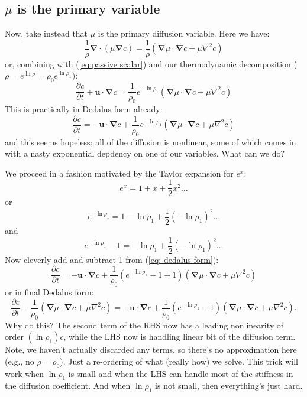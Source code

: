 \documentclass[letterpaper,12pt]{paper}
\newcommand{\del}{\ensuremath{\mathbf{\nabla}}}
\renewcommand{\vec}[1]{\ensuremath{\mathbf{#1}}}
\begin{document}
\newpage
\subsection{$\mu$ is the primary variable}
Now, take instead that $\mu$ is the primary diffusion variable.  Here we have:
\begin{equation}
\frac{1}{\rho} \del \cdot \left(\mu \del c\right) = \frac{1}{\rho}\left(\del \mu \cdot \del c + \mu \nabla^2 c\right) 
\end{equation}
or, combining with (\ref{eq:passive scalar}) and our thermodynamic decomposition ($\rho = e^{\ln \rho} = \rho_0 e^{\ln \rho_1})$:
\begin{equation}
\frac{\partial c}{\partial t} + \vec{u}\cdot\del c  = \frac{1}{\rho_0}e^{-\ln \rho_1}\left(\del \mu \cdot \del c + \mu \nabla^2 c\right) 
\end{equation}
This is practically in Dedalus form already:
\begin{equation}
\frac{\partial c}{\partial t} = -\vec{u}\cdot\del c  + \frac{1}{\rho_0}e^{-\ln \rho_1}\left(\del \mu \cdot \del c + \mu \nabla^2 c\right) 
\label{eq: dedalus form}
\end{equation}
and this seems hopeless; all of the diffusion is nonlinear, some of which comes in with a nasty exponential depdency on one of our variables.  What can we do?

We proceed in a fashion motivated by the Taylor expansion for $e^x$:
\begin{equation}
e^{x} = 1 + x + \frac{1}{2}x^2 \ldots
\end{equation}
or
\begin{equation}
e^{-\ln \rho_1} = 1 -\ln \rho_1 + \frac{1}{2}(-\ln \rho_1)^2 \ldots
\end{equation}
and
\begin{equation}
e^{-\ln \rho_1} - 1 = -\ln \rho_1 + \frac{1}{2}(-\ln \rho_1)^2 \ldots
\end{equation}
Now cleverly add and subtract 1 from (\ref{eq: dedalus form}):
\begin{equation}
\frac{\partial c}{\partial t} = -\vec{u}\cdot\del c  + \frac{1}{\rho_0}\left(e^{-\ln \rho_1} -1 + 1\right)\left(\del \mu \cdot \del c + \mu \nabla^2 c\right) 
\end{equation}
or in final Dedalus form:
\begin{equation}
\frac{\partial c}{\partial t} -\frac{1}{\rho_0}\left(\del \mu \cdot \del c + \mu \nabla^2 c\right) = -\vec{u}\cdot\del c  + \frac{1}{\rho_0}\left(e^{-\ln \rho_1} -1\right)\left(\del \mu \cdot \del c + \mu \nabla^2 c\right).
\end{equation}
Why do this?  The second term of the RHS now has a leading nonlinearity of order $(\ln \rho_1) c$, while the LHS now is handling linear bit of the diffusion term.  Note, we haven't actually discarded any terms, so there's no approximation here (e.g., no $\rho=\rho_0$).  Just a re-ordering of what (really how) we solve.  This trick will work when $\ln \rho_1$ is small and when the LHS can handle most of the stiffness in the diffusion coefficient.  And when $\ln \rho_1$ is not small, then everything's just hard.
\end{document}
